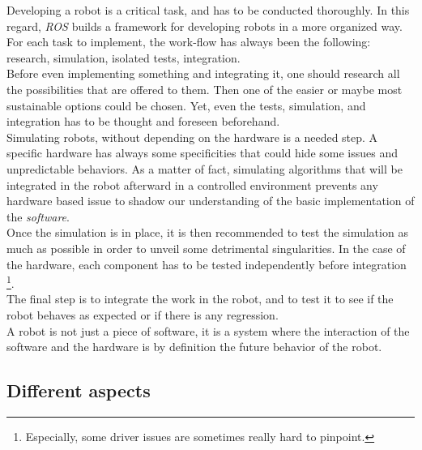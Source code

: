 		Developing a robot is a critical task, and has to be conducted thoroughly. 
		In this regard, \textit{ROS} builds a framework for developing 
		robots in a more organized way. For each task to implement, 
		the work-flow has always been the following: research, simulation, isolated 
		tests, integration.
		\\\indent Before even implementing something and integrating it, one should 
		research all the possibilities that are offered to them. Then one of the 
		easier or maybe most sustainable options could be chosen. Yet, even the
		tests, simulation, and integration has to be thought and foreseen beforehand.
		\\\indent Simulating robots, without depending on the hardware is
		a needed step.	 A specific hardware has always some specificities that
		could hide some issues and unpredictable behaviors. As a matter of fact, 
		simulating algorithms that will be integrated in the robot afterward in 
		a controlled environment prevents any hardware based issue to shadow
		our understanding of the basic implementation of
		the \textit{software}.
		\\\indent Once the simulation is in place, it is then 
		recommended to test the simulation as much as possible in order
		to unveil some detrimental singularities. In the case of the hardware, 
		each component has to be tested independently before integration
		\footnote{Especially, some driver issues are sometimes really 
		hard to pinpoint.}.
		\\\indent The final step is to integrate the work in the robot, and
		to test it to see if the robot behaves as expected or if there 
		is any regression.
		\\\indent A robot is not just a piece of software, it is a system 
		where the interaction of the software and the hardware is by 
		definition the future behavior of the robot.
		
		\subsection{Different aspects}

